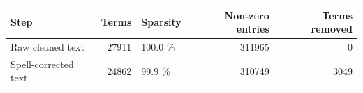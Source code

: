 \begin{tabular}{lrlrr}
\toprule
Step & Terms & Sparsity & Non-zero entries & Terms removed \\
\midrule
Raw cleaned text & 27911 & 100.0 \% & 311965 & 0 \\
Spell-corrected text & 24862 & 99.9 \% & 310749 & 3049 \\
\bottomrule
\end{tabular}
